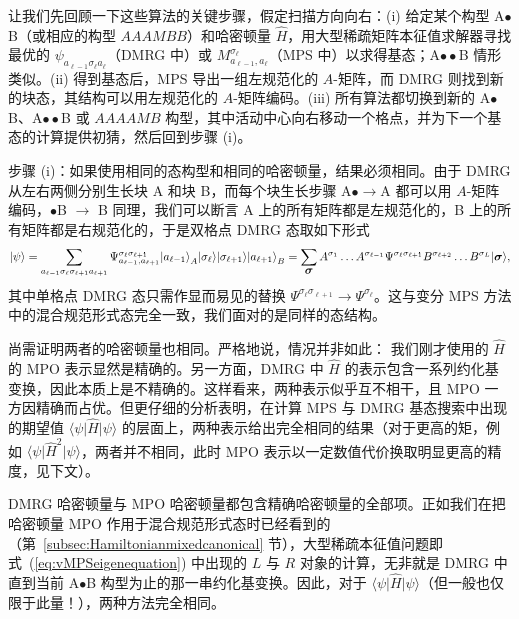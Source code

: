 \documentclass[a4paper,10pt,oneside,onecolumn,1p,times]{elsarticle}
\newcommand{\bra}[1]{\mbox{$\langle #1  |$}}
\newcommand{\ket}[1]{\mbox{$| #1  \rangle$}}
\newcommand{\fat}[1]{\mbox{\boldmath$#1$\unboldmath}}	%
\begin{document}
让我们先回顾一下这些算法的关键步骤，假定扫描方向向右：(i) 给定某个构型 A$\bullet$B（或相应的构型 $AAAMBB$）和哈密顿量 $\hat{H}$，用大型稀疏矩阵本征值求解器寻找最优的 $\psi_{a_{\ell-1} \sigma_\ell a_\ell}$（DMRG 中）或 $M^{\sigma_\ell}_{a_{\ell-1}, a_\ell}$（MPS 中）以求得基态；A$\bullet\bullet$B 情形类似。(ii) 得到基态后，MPS 导出一组左规范化的 $A$-矩阵，而 DMRG 则找到新的块态，其结构可以用左规范化的 $A$-矩阵编码。(iii) 所有算法都切换到新的 A$\bullet$B、A$\bullet\bullet$B 或 $AAAAMB$ 构型，其中活动中心向右移动一个格点，并为下一个基态的计算提供初猜，然后回到步骤 (i)。

步骤 (i)：如果使用相同的态构型和相同的哈密顿量，结果必须相同。由于 DMRG 从左右两侧分别生长块 A 和块 B，而每个块生长步骤 A$\bullet \rightarrow$A 都可以用 $A$-矩阵编码，$\bullet$B $\rightarrow$ B 同理，我们可以断言 A 上的所有矩阵都是左规范化的，B 上的所有矩阵都是右规范化的，于是双格点 DMRG 态取如下形式
\begin{equation}
\ket{\psi} = \sum_{a_{\ell-1} \sigma_\ell \sigma_{\ell+1} a_{\ell+1}} \Psi^{\sigma_\ell\sigma_{\ell+1}}_{a_{\ell-1}, a_{\ell+1}} \ket{a_{\ell-1}}_A \ket{\sigma_\ell} \ket{\sigma_{\ell+1}} \ket{a_{\ell+1}}_B = \sum_{\fat{\sigma}} A^{\sigma_1} \ldots A^{\sigma_{\ell-1}} 
\Psi^{\sigma_\ell \sigma_{\ell+1}} B^{\sigma_{\ell+2}} \ldots B^{\sigma_L} \ket{\fat{\sigma}},
\end{equation}
其中单格点 DMRG 态只需作显而易见的替换 $\Psi^{\sigma_\ell\sigma_{\ell+1}} \rightarrow \Psi^{\sigma_\ell}$。这与变分 MPS 方法中的混合规范形式态完全一致，我们面对的是同样的态结构。 

尚需证明两者的哈密顿量也相同。严格地说，情况并非如此：
我们刚才使用的 $\hat{H}$ 的 MPO 表示显然是精确的。另一方面，DMRG 中 $\hat{H}$ 的表示包含一系列约化基变换，因此本质上是不精确的。这样看来，两种表示似乎互不相干，且 MPO 一方因精确而占优。但更仔细的分析表明，在计算 MPS 与 DMRG 基态搜索中出现的期望值 $\bra{\psi} \hat{H} \ket{\psi}$ 的层面上，两种表示给出完全相同的结果（对于更高的矩，例如 $\bra{\psi} \hat{H}^2 \ket{\psi}$，两者并不相同，此时 MPO 表示以一定数值代价换取明显更高的精度，见下文）。

DMRG 哈密顿量与 MPO 哈密顿量都包含精确哈密顿量的全部项。正如我们在把哈密顿量 MPO 作用于混合规范形式态时已经看到的（第~\ref{subsec:Hamiltonianmixedcanonical} 节），大型稀疏本征值问题即式~(\ref{eq:vMPSeigenequation}) 中出现的 $L$ 与 $R$ 对象的计算，无非就是 DMRG 中直到当前 A$\bullet$B 构型为止的那一串约化基变换。因此，对于 $\bra{\psi} \hat{H} \ket{\psi}$（但一般也仅限于此量！），两种方法完全相同。
\end{document}
